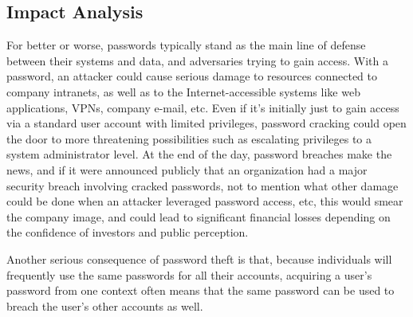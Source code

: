 \subsection{Impact Analysis}
For better or worse, passwords typically stand as the main line of defense between their systems and data, and adversaries trying to gain access. With a password, an attacker could cause serious damage to resources connected to company intranets, as well as to the Internet-accessible systems like web applications, VPNs, company e-mail, etc. Even if it’s initially just to gain access via a standard user account with limited privileges, password cracking could open the door to more threatening possibilities such as escalating privileges to a system administrator level. At the end of the day, password breaches make the news, and if it were announced publicly that an organization had a major security breach involving cracked passwords, not to mention what other damage could be done when an attacker leveraged password access, etc, this would smear the company image, and could lead to significant financial losses depending on the confidence of investors and public perception.

Another serious consequence of password theft is that, because individuals will frequently use the same passwords for all their accounts, acquiring a user’s password from one context often means that the same password can be used to breach the user’s other accounts as well.
